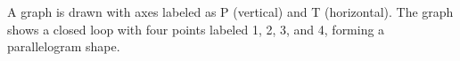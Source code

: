 A graph is drawn with axes labeled as P (vertical) and T (horizontal). The graph shows a closed loop with four points labeled 1, 2, 3, and 4, forming a parallelogram shape.